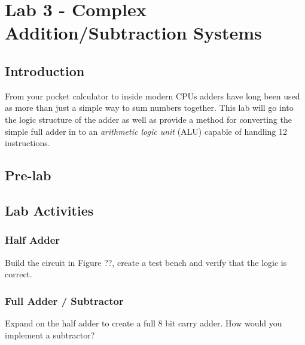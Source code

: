 \section{Lab 3 - Complex Addition/Subtraction Systems}

\subsection{Introduction}
From your pocket calculator to inside modern CPUs adders have long been used as more than just a simple way to sum numbers together. This lab will go into the logic structure of the adder as well as provide a method for converting the simple full adder in to an \emph{arithmetic logic unit} (ALU) capable of handling 12 instructions. 

\subsection{Pre-lab}

\subsection{Lab Activities}

\subsubsection{Half Adder}
Build the circuit in Figure ??, create a test bench and verify that the logic is correct.


\subsubsection{Full Adder / Subtractor}
Expand on the half adder to create a full 8 bit carry adder. How would you implement a subtractor?










